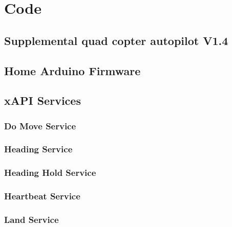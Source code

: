 \documentclass[pdftex,11pt]{article}
\begin{document}
\clearpage


\clearpage

\section{Code}
\label{sec:code}
	\subsection{Supplemental quad copter autopilot V1.4}
	
	
	\subsection{Home Arduino Firmware}
		
		
	\subsection{xAPI Services}
		\subsubsection{Do Move Service}
			
			
		\subsubsection{Heading Service}
			
					
		\subsubsection{Heading Hold Service}
			
					
		\subsubsection{Heartbeat Service}
			
					
		\subsubsection{Land Service}
			
					
\end{document}
